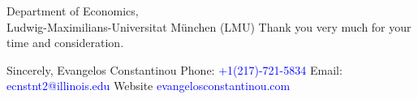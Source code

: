 \documentclass[12pt]{letter}
\begin{document}
\begin{letter}{Department of Economics,\\
    Ludwig-Maximilians-Universitat München (LMU)}
Thank you very much for your time and consideration.


\noindent Sincerely,
\newline\noindent Evangelos Constantinou
\vspace{4mm}
\newline\noindent Phone: \textcolor{blue}{+1(217)-721-5834}
\newline\noindent Email: \textcolor{blue}{ecnstnt2@illinois.edu}
\newline\noindent Website \textcolor{blue}{evangelosconstantinou.com}
\end{letter}
\end{document}
